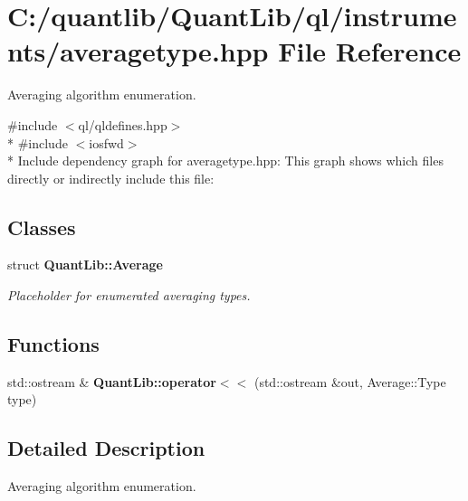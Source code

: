 \section{C\+:/quantlib/\+Quant\+Lib/ql/instruments/averagetype.hpp File Reference}
\label{averagetype_8hpp}


Averaging algorithm enumeration.  


{\ttfamily \#include $<$ql/qldefines.\+hpp$>$}\\*
{\ttfamily \#include $<$iosfwd$>$}\\*
Include dependency graph for averagetype.\+hpp\+:
This graph shows which files directly or indirectly include this file\+:
\subsection*{Classes}
\begin{DoxyCompactItemize}
\item 
struct {\bf Quant\+Lib\+::\+Average}
\begin{DoxyCompactList}\small\item\em Placeholder for enumerated averaging types. \end{DoxyCompactList}\end{DoxyCompactItemize}
\subsection*{Functions}
\begin{DoxyCompactItemize}
\item 
std\+::ostream \& {\bfseries Quant\+Lib\+::operator$<$$<$} (std\+::ostream \&out, Average\+::\+Type type)\label{averagetype_8cpp_a91f2ade2fe18f48c7fe500a7d695b510}

\end{DoxyCompactItemize}


\subsection{Detailed Description}
Averaging algorithm enumeration. 

